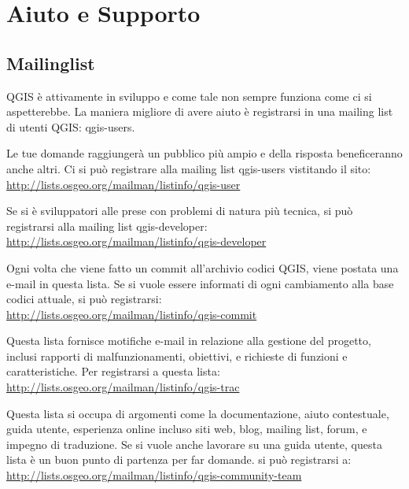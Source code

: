 
\section{Aiuto e Supporto}\label{label_helpsupport}


\subsection{Mailinglist}
QGIS è attivamente in sviluppo e come tale non sempre funziona come ci si aspetterebbe. La maniera migliore di avere aiuto è registrarsi in una mailing list di utenti QGIS: qgis-users. 

Le tue domande raggiungerà un pubblico più ampio e della risposta beneficeranno anche altri. Ci si può registrare alla mailing list qgis-users vistitando il sito: \\
\url{http://lists.osgeo.org/mailman/listinfo/qgis-user}

Se si è sviluppatori alle prese con problemi di natura più tecnica, si può registrarsi alla mailing list qgis-developer:\\
\url{http://lists.osgeo.org/mailman/listinfo/qgis-developer}

Ogni volta che viene fatto un commit all'archivio codici QGIS, viene postata una e-mail in questa lista. Se si vuole essere informati di ogni cambiamento alla base codici attuale, si può registrarsi:\\
\url{http://lists.osgeo.org/mailman/listinfo/qgis-commit}

Questa lista fornisce motifiche e-mail in relazione alla gestione del progetto, inclusi rapporti di malfunzionamenti, obiettivi, e richieste di funzioni e caratteristiche. Per registrarsi a questa lista:\\
\url{http://lists.osgeo.org/mailman/listinfo/qgis-trac}

Questa lista si occupa di argomenti come la documentazione, aiuto contestuale, guida utente, esperienza online incluso siti web, blog, mailing list, forum, e impegno di traduzione. Se si vuole anche lavorare su una guida utente, questa lista è un buon punto di partenza per far domande. si può registrarsi a:\\
\url{http://lists.osgeo.org/mailman/listinfo/qgis-community-team}

